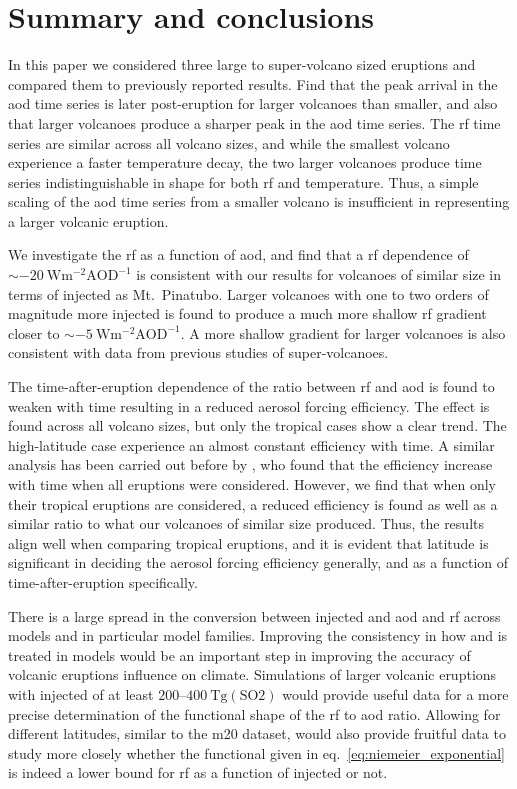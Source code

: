 \documentclass{ametsocV6.1}
\newcommand{\iso}[1][i]{{#1}njected \ce{SO2}}
\begin{document}
\section{Summary and conclusions}\label{sec:conclusions}

In this paper we considered three large to super-volcano sized eruptions and compared
them to previously reported results. Find that the peak arrival in the \gls{aod} time
series is later post-eruption for larger volcanoes than smaller, and also that larger
volcanoes produce a sharper peak in the \gls{aod} time series. The \gls{rf} time series
are similar across all volcano sizes, and while the smallest volcano experience a faster
temperature decay, the two larger volcanoes produce time series indistinguishable in
shape for both \gls{rf} and temperature. Thus, a simple scaling of the \gls{aod} time
series from a smaller volcano is insufficient in representing a larger volcanic
eruption.

We investigate the \gls{rf} as a function of \gls{aod}, and find that a \gls{rf}
dependence of \(\sim\SI{-20}{\watt\metre^{-2}\mathrm{AOD}^{-1}}\) is consistent with our
results for volcanoes of similar size in terms of \iso{} as Mt.\ Pinatubo. Larger
volcanoes with one to two orders of magnitude more \iso{} is found to produce a much
more shallow \gls{rf} gradient closer to \(\sim
\SI{-5}{\watt\metre^{-2}\mathrm{AOD}^{-1}}\). A more shallow gradient for larger
volcanoes is also consistent with data from previous studies of super-volcanoes.

The time-after-eruption dependence of the ratio between \gls{rf} and \gls{aod} is found
to weaken with time resulting in a reduced aerosol forcing efficiency. The effect is
found across all volcano sizes, but only the tropical cases show a clear trend. The
high-latitude case experience an almost constant efficiency with time. A similar
analysis has been carried out before by \citet{marshall2020}, who found that the
efficiency increase with time when all eruptions were considered. However, we find that
when only their tropical eruptions are considered, a reduced efficiency is found as well
as a similar ratio to what our volcanoes of similar size produced. Thus, the results
align well when comparing tropical eruptions, and it is evident that latitude is
significant in deciding the aerosol forcing efficiency generally, and as a function of
time-after-eruption specifically.

There is a large spread in the conversion between \iso{} and \gls{aod} and \gls{rf}
across models and in particular model families. Improving the consistency in how
 and  is treated in models would be an important step in improving the
accuracy of volcanic eruptions influence on climate. Simulations of larger volcanic
eruptions with \iso{} of at least \(200\)--\(\SI{400}{\tera\gram(\mathrm{SO2})}\) would
provide useful data for a more precise determination of the functional shape of the
\gls{rf} to \gls{aod} ratio. Allowing for different latitudes, similar to the \gls{m20}
dataset, would also provide fruitful data to study more closely whether the functional
given in eq.~\ref{eq:niemeier_exponential} is indeed a lower bound for \gls{rf} as a
function of \iso{} or not.
\end{document}
